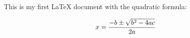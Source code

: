 \documentclass[11]{article}
\begin{document}
This is my first LaTeX document with the quadratic formula:

$$x={-b\pm\sqrt{b^2-4ac} \over 2a}$$
\end{document}
